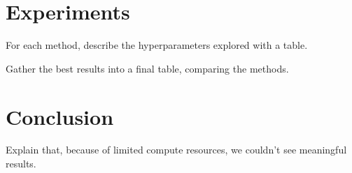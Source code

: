 \documentclass[a4paper,10pt,twocolumn,english]{article}
\begin{document}
\section{Experiments}
For each method, describe the hyperparameters explored with a table.

Gather the best results into a final table, comparing the methods.

\section{Conclusion}
Explain that, because of limited compute resources, we couldn't see meaningful results.



\end{document}
